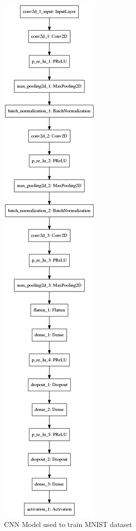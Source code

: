 \documentclass[12pt, letterpaper]{article}
\begin{document}
\begin{figure}
	\centering
	\includegraphics[scale = 0.25]{trained_model_diagram.png}
	
	\caption{CNN Model used to train MNIST dataset} \label{model}
\end{figure}
\newpage
\end{document}
